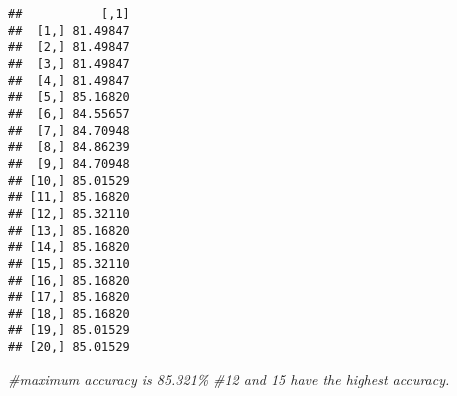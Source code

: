 \documentclass[
]{article}
\newenvironment{Shaded}{\begin{snugshade}}{\end{snugshade}}
\newcommand{\CommentTok}[1]{\textcolor[rgb]{0.56,0.35,0.01}{\textit{#1}}}
\begin{document}
\begin{verbatim}
##           [,1]
##  [1,] 81.49847
##  [2,] 81.49847
##  [3,] 81.49847
##  [4,] 81.49847
##  [5,] 85.16820
##  [6,] 84.55657
##  [7,] 84.70948
##  [8,] 84.86239
##  [9,] 84.70948
## [10,] 85.01529
## [11,] 85.16820
## [12,] 85.32110
## [13,] 85.16820
## [14,] 85.16820
## [15,] 85.32110
## [16,] 85.16820
## [17,] 85.16820
## [18,] 85.16820
## [19,] 85.01529
## [20,] 85.01529
\end{verbatim}

\begin{Shaded}
\begin{Highlighting}[]
\CommentTok{\#maximum accuracy is 85.321\%}
\CommentTok{\#12 and 15 have the highest accuracy.}
\end{Highlighting}
\end{Shaded}
\end{document}
